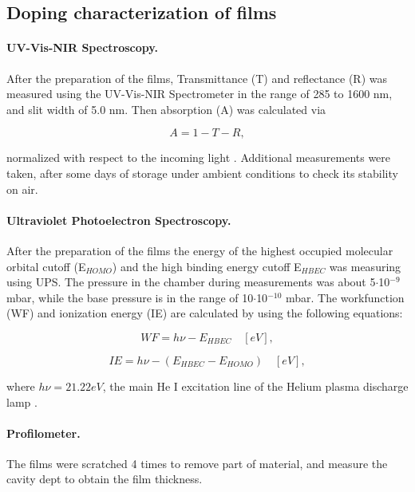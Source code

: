 \subsection{Doping characterization of films}

\paragraph{UV-Vis-NIR Spectroscopy.}After the preparation of the films, Transmittance (T) and reflectance (R) was measured using the UV-Vis-NIR Spectrometer in the range of 285 to 1600 nm, and slit width of 5.0 nm. Then absorption (A) was calculated via


\begin{equation}\label{eq:abs}
	A = 1 - T - R,
\end{equation}

normalized with respect to the incoming light \cite{uvvis}. Additional measurements were taken, after some days of storage under ambient conditions to check its stability on air.

\paragraph{Ultraviolet Photoelectron Spectroscopy.}After the preparation of the films %
the energy of the highest occupied molecular orbital cutoff (E$_{HOMO}$) and the high binding energy cutoff E$_{HBEC}$ was measuring using UPS. The pressure in the chamber during measurements was about 5$\cdot$10$^{-9}$ mbar, while the base pressure is in the range of 10$\cdot$10$^{-10}$ mbar. The workfunction (WF) and ionization energy (IE) are calculated by using the following equations:

\begin{equation}\label{eq:wf}
	WF = h\nu - E_{HBEC} \quad [eV],
\end{equation}

\begin{equation}\label{eq:ie}
	IE = h\nu - (E_{HBEC}-E_{HOMO}) \quad [eV],
\end{equation}

where $h\nu = 21.22 eV$, the main He I excitation line of the Helium plasma discharge lamp \cite{buchholtzDopingPropertiesNovel2021}. 

\paragraph{Profilometer.}The films were scratched 4 times to remove part of material, and measure the cavity dept to obtain the film thickness.

